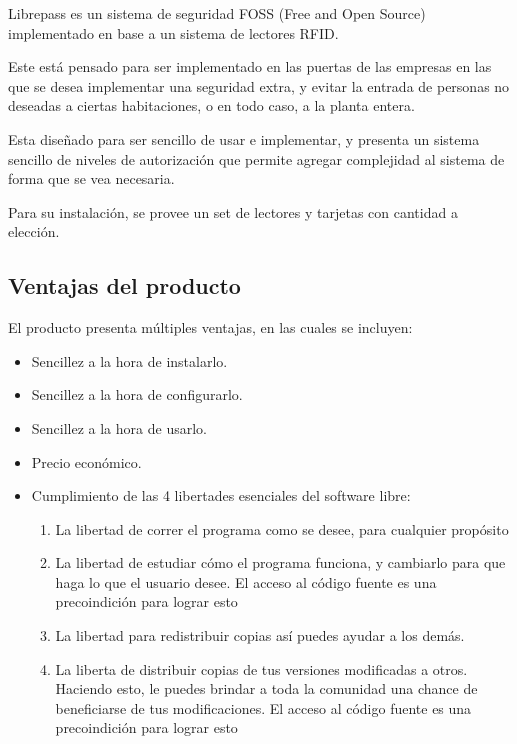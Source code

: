 \documentclass{article}
\begin{document}
Librepass es un sistema de seguridad FOSS (Free and Open Source) implementado en
base a un sistema de lectores RFID.

Este está pensado para ser implementado en las puertas de las empresas en
las que se desea implementar una seguridad extra, y evitar la entrada de personas
no deseadas a ciertas habitaciones, o en todo caso, a la planta entera.

Esta diseñado para ser sencillo de usar e implementar, y presenta un sistema
sencillo de niveles de autorización que permite agregar complejidad al sistema
de forma que se vea necesaria.

Para su instalación, se provee un set de lectores y tarjetas con cantidad a elección.

\subsection{Ventajas del producto}
El producto presenta múltiples ventajas, en las cuales se incluyen:
\begin{itemize}
	\item Sencillez a la hora de instalarlo.
	\item Sencillez a la hora de configurarlo.
	\item Sencillez a la hora de usarlo.
	\item Precio económico.
	\item Cumplimiento de las 4 libertades esenciales del software libre:
	      \begin{enumerate}
		      \item La libertad de correr el programa como se desee, para cualquier propósito
		      \item La libertad de estudiar cómo el programa funciona, y cambiarlo para que
		            haga lo que el usuario desee.
		            El acceso al código fuente es una precoindición para lograr esto
		      \item La libertad para redistribuir copias así puedes ayudar a los demás.
		      \item La liberta de distribuir copias de tus versiones modificadas a otros.
		            Haciendo esto, le puedes brindar a toda la comunidad una chance de beneficiarse
		            de tus modificaciones.
		            El acceso al código fuente es una precoindición para lograr esto
	      \end{enumerate}
\end{itemize}
\end{document}
